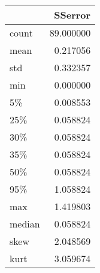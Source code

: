 \begin{tabular}{lr}
\toprule
{} &    SSerror \\
\midrule
count  &  89.000000 \\
mean   &   0.217056 \\
std    &   0.332357 \\
min    &   0.000000 \\
5\%     &   0.008553 \\
25\%    &   0.058824 \\
30\%    &   0.058824 \\
35\%    &   0.058824 \\
50\%    &   0.058824 \\
95\%    &   1.058824 \\
max    &   1.419803 \\
median &   0.058824 \\
skew   &   2.048569 \\
kurt   &   3.059674 \\
\bottomrule
\end{tabular}
